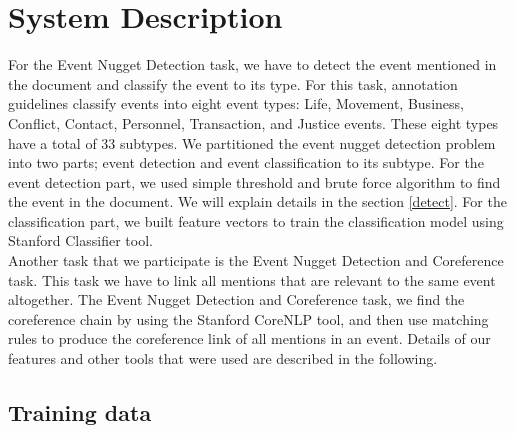 \documentclass[11pt]{article}
\begin{document}
\section{System Description}
\label{description}
For the Event Nugget Detection task, we have to detect the event mentioned in the document and classify the event to its type. For this task, annotation guidelines \cite{teruko2} classify events into eight event types: Life, Movement, Business, Conflict, Contact, Personnel, Transaction, and Justice events. These eight types have a total of 33 subtypes. We partitioned the event nugget detection problem into two parts; event detection and event classification to its subtype. For the event detection part, we used simple threshold and brute force algorithm to find the event in the document. We will explain details in the section \ref{detect}. For the classification part, we built feature vectors to train the classification model using Stanford Classifier tool. \\
\indent Another task that we participate is the Event Nugget Detection and Coreference task. This task we have to link all mentions that are relevant to the same event altogether. The Event Nugget Detection and Coreference task, we find the coreference chain by using the Stanford CoreNLP tool, and then use matching rules to produce the coreference link of all mentions in an event. Details of our features and other tools that were used are described in the following.

\subsection{Training data}
\end{document}
